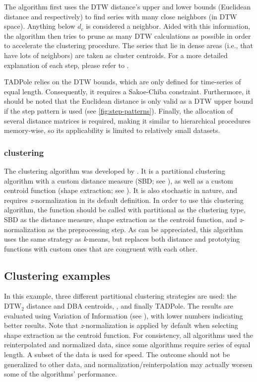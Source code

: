 The algorithm first uses the DTW distance's upper and lower bounds
(Euclidean distance and  respectively)
to find series with many close neighbors (in DTW space).
Anything below $d_c$ is considered a neighbor.
Aided with this information,
the algorithm then tries to prune as many DTW calculations as possible in order to accelerate the clustering procedure.
The series that lie in dense areas
(i.e., that have lots of neighbors)
are taken as cluster centroids.
For a more detailed explanation of each step,
please refer to \citet{begum2015}.

TADPole relies on the DTW bounds,
which are only defined for time-series of equal length.
Consequently, it requires a Sakoe-Chiba constraint.
Furthermore, it should be noted that the Euclidean distance is only valid as a DTW upper bound if the  step pattern is used (see \cref{fig:step-patterns}).
Finally, the allocation of several distance matrices is required,
making it similar to hierarchical procedures memory-wise,
so its applicability is limited to relatively small datasets.

\subsubsection{\kshape{} clustering}
\label{sec:kshape}

The \kshape{} clustering algorithm was developed by \citet{paparrizos2015}.
It is a partitional clustering algorithm with a custom distance measure (SBD; see ),
as well as a custom centroid function (shape extraction; see ).
It is also stochastic in nature,
and requires \textit{z}-normalization in its default definition.
In order to use this clustering algorithm,
the  function should be called with partitional as the clustering type,
SBD as the distance measure,
shape extraction as the centroid function,
and \textit{z}-normalization as the preprocessing step.
As can be appreciated,
this algorithm uses the same strategy as \textit{k}-means,
but replaces both distance and prototying functions with custom ones that are congruent with each other.

\subsection{Clustering examples}
\label{sec:partitional-example}

In this example,
three different partitional clustering strategies are used:
the $\text{DTW}_2$ distance and DBA centroids,
\kshape{},
and finally TADPole.
The results are evaluated using Variation of Information
(see ),
with lower numbers indicating better results.
Note that \textit{z}-normalization is applied by default when selecting shape extraction as the centroid function.
For consistency, all algorithms used the reinterpolated and normalized data,
since some algorithms require series of equal length.
A subset of the data is used for speed.
The outcome should not be generalized to other data,
and normalization/reinterpolation may actually worsen some of the algorithms' performance.

